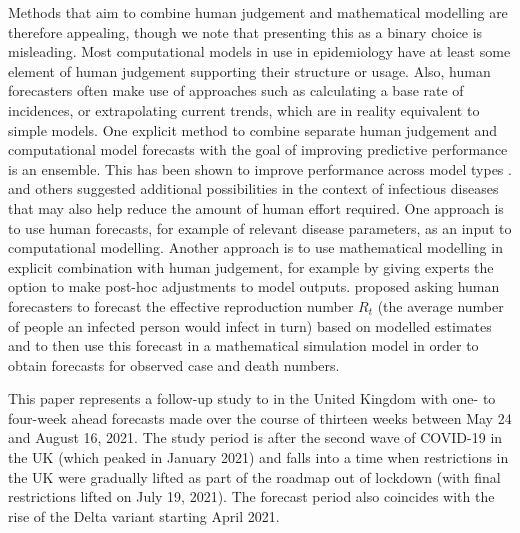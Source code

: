 \documentclass[10pt,a4paper,twocolumn]{article}
\begin{document}
Methods that aim to combine human judgement and mathematical modelling are therefore appealing, though we note that presenting this as a binary choice is misleading. Most computational models in use in epidemiology have at least some element of human judgement supporting their structure or usage. Also, human forecasters often make use of approaches such as calculating a base rate of incidences, or extrapolating current trends, which are in reality equivalent to simple models. One explicit method to combine separate human judgement and computational model forecasts with the goal of improving predictive performance is an ensemble. This has been shown to improve performance across model types \citep{mcandrewChimericForecastingCombining2022}. \citet{farrowHumanJudgmentApproach2017, bosseComparingHumanModelbased2022, swallowChallengesEstimationUncertainty2022} and others suggested additional possibilities in the context of infectious diseases that may also help reduce the amount of human effort required. One approach is to use human forecasts, for example of relevant disease parameters, as an input to computational modelling. Another approach is to use mathematical modelling in explicit combination with human judgement, for example by giving experts the option to make post-hoc adjustments to model outputs. \citet{bosseComparingHumanModelbased2022} proposed asking human forecasters to forecast the effective reproduction number $R_t$ (the average number of people an infected person would infect in turn) based on modelled estimates and to then use this forecast in a mathematical simulation model in order to obtain forecasts for observed case and death numbers. 

This paper represents a follow-up study to \citet{bosseComparingHumanModelbased2022} in the United Kingdom with one- to four-week ahead forecasts made over the course of thirteen weeks between May 24 and August 16, 2021. The study period is after the second wave of COVID-19 in the UK (which peaked in January 2021) and falls into a time when restrictions in the UK were gradually lifted as part of the roadmap out of lockdown (with final restrictions lifted on July 19, 2021). The forecast period also coincides with the rise of the Delta variant \citep{bastIncreasedRiskHospitalisation2021, perez-guzmanEpidemiologicalDriversTransmissibility2023} starting April 2021. 
\end{document}
